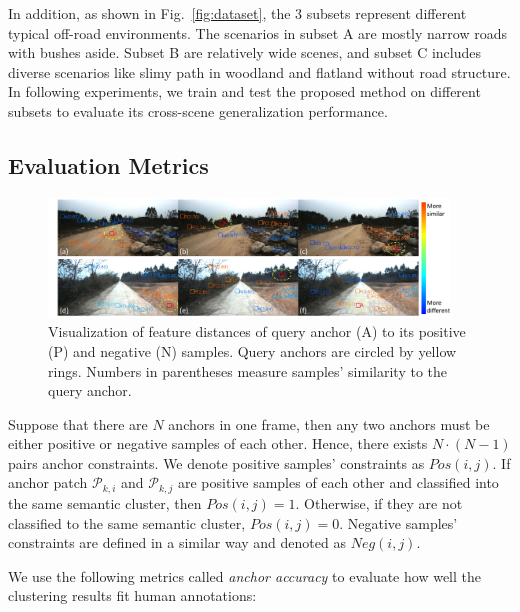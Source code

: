 \documentclass[letterpaper, 10 pt, conference]{ieeeconf}  %
\begin{document}
In addition, as shown in Fig.~\ref{fig:dataset}, the 3 subsets represent different typical off-road environments. The scenarios in subset A are mostly narrow roads with bushes aside. Subset B are relatively wide scenes, and subset C includes diverse scenarios like slimy path in woodland and flatland without road structure. In following experiments, we train and test the proposed method on different subsets to evaluate its cross-scene generalization performance.


\subsection{Evaluation Metrics}

\begin{figure}[]
	\centering
	\includegraphics[width=0.95\textwidth]{anchor_dis.pdf}
	\caption{Visualization of feature distances of query anchor (A) to its positive (P) and negative (N) samples. Query anchors are circled by yellow rings. Numbers in parentheses measure samples' similarity to the query anchor.}
	\label{fig:anchor_dis}
\end{figure}

Suppose that there are $N$ anchors in one frame, then any two anchors must be either positive or negative samples of each other. Hence, there exists $N \cdot(N-1)$ pairs anchor constraints.
We denote positive samples' constraints as $Pos(i,j)$. If anchor patch $\mathcal{P}_{k,i}$ and $\mathcal{P}_{k,j}$ are positive samples of each other and classified into the same semantic cluster, then $Pos(i,j)=1$. Otherwise, if they are not classified to the same semantic cluster, $Pos(i,j)=0$.
Negative samples' constraints are defined in a similar way and denoted as $Neg(i,j)$.

We use the following metrics called \textit{anchor accuracy} to evaluate how well the clustering results fit human annotations:
\end{document}
